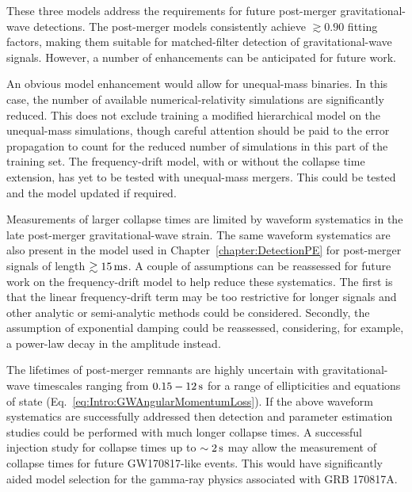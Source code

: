 \documentclass[../Thesis.tex]{subfiles}
\begin{document}
    These three models address the requirements for future post-merger gravitational-wave detections.
    The post-merger models consistently achieve $\gtrsim 0.90$ fitting factors, making them suitable for matched-filter detection of gravitational-wave signals.
    However, a number of enhancements can be anticipated for future work. \par
    
    An obvious model enhancement would allow for unequal-mass binaries.
    In this case, the number of available numerical-relativity simulations are significantly reduced.
    This does not exclude training a modified hierarchical model on the unequal-mass simulations, though careful attention should be  paid to the error propagation to count for the reduced number of simulations in this part of the training set.
    The frequency-drift model, with or without the collapse time extension, has yet to be tested with unequal-mass mergers.
    This could be tested and the model updated if required. \par
    
    Measurements of larger collapse times are limited by waveform systematics in the late post-merger gravitational-wave strain.
    The same waveform systematics are also present in the model used in Chapter~\ref{chapter:DetectionPE} for post-merger signals of length $\gtrsim 15\,\mathrm{ms}$.
    A couple of assumptions can be reassessed for future work on the frequency-drift model to help reduce these systematics. 
    The first is that the linear frequency-drift term may be too restrictive for longer signals and other analytic or semi-analytic methods could be considered.
    Secondly, the assumption of exponential damping could be reassessed, considering, for example, a power-law decay in the amplitude instead.
    \par

    The lifetimes of post-merger remnants are highly uncertain with gravitational-wave timescales ranging from $0.15-12\,\mathrm{s}$ for a range of ellipticities and equations of state (Eq.~\ref{eq:Intro:GWAngularMomentumLoss}).
    If the above waveform systematics are successfully addressed then detection and parameter estimation studies could be performed with much longer collapse times. 
    A successful injection study for collapse times up to $\sim 2\,\mathrm{s}$ may allow the measurement of collapse times for future GW170817-like events.
    This would have significantly aided model selection for the gamma-ray physics associated with GRB 170817A.\par
\end{document}
